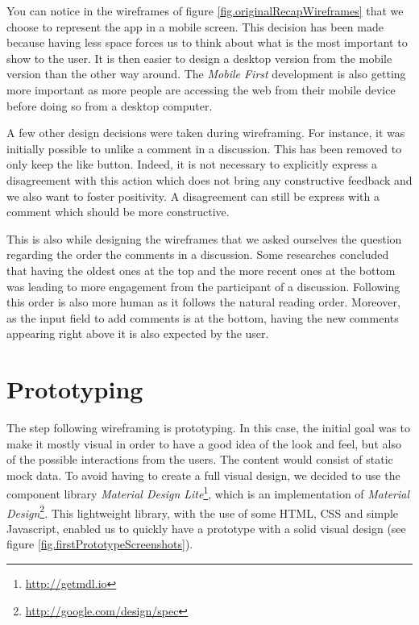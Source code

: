 \documentclass[a4paper,12pt,twoside]{article}
\begin{document}
You can notice in the wireframes of figure \ref{fig.originalRecapWireframes} that we choose to represent the app in a mobile screen.
This decision has been made because having less space forces us to think about what is the most important to show to the user.
It is then easier to design a desktop version from the mobile version than the other way around.
The \emph{Mobile First} development is also getting more important as more people are accessing the web from their mobile device before doing so from a desktop computer.

A few other design decisions were taken during wireframing.
For instance, it was initially possible to unlike a comment in a discussion.
This has been removed to only keep the like button.
Indeed, it is not necessary to explicitly express a disagreement with this action which does not bring any constructive feedback and we also want to foster positivity.
A disagreement can still be express with a comment which should be more constructive.

This is also while designing the wireframes that we asked ourselves the question regarding the order the comments in a discussion.
Some researches \cite{mabande2010designing} concluded that having the oldest ones at the top and the more recent ones at the bottom was leading to more engagement from the participant of a discussion.
Following this order is also more human as it follows the natural reading order.
Moreover, as the input field to add comments is at the bottom, having the new comments appearing right above it is also expected by the user.


\section{Prototyping}
The step following wireframing is prototyping.
In this case, the initial goal was to make it mostly visual in order to have a good idea of the look and feel, but also of the possible interactions from the users.
The content would consist of static mock data.
To avoid having to create a full visual design, we decided to use the component library \emph{Material Design Lite}\footnote{\url{http://getmdl.io}}, which is an implementation of \emph{Material Design}\footnote{\url{http://google.com/design/spec}}.
This lightweight library, with the use of some HTML, CSS and simple Javascript, enabled us to quickly have a prototype with a solid visual design (see figure \ref{fig.firstPrototypeScreenshots}).
\end{document}
